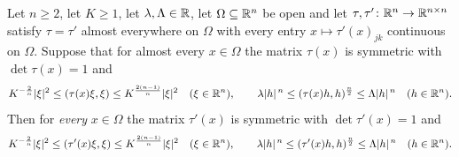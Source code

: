 \begin{lemma}
Let $n\ge2$, let $K\ge1$, let $\lambda,\Lambda\in\mathbb{R}$, let $\Omega\subseteq\mathbb{R}^n$ be open and
let $\tau,\tau'\colon\mathbb{R}^n\to\mathbb{R}^{n\times n}$ satisfy $\tau=\tau'$ almost
everywhere on $\Omega$ with every entry $x\mapsto\tau'(x)_{jk}$ continuous on
$\Omega$.  Suppose that for almost every $x\in\Omega$ the matrix $\tau(x)$ is
symmetric with $\det\tau(x)=1$ and
\[
K^{-\frac2n}|\xi|^2\le(\tau(x)\xi,\xi)\le K^{\frac{2(n-1)}n}|\xi|^2\quad
(\xi\in\mathbb{R}^n),
\qquad
\lambda|h|^{\,n}\le(\tau(x)h,h)^{\frac n2}\le\Lambda|h|^{\,n}\quad(h\in\mathbb{R}^n).
\]
Then for \emph{every} $x\in\Omega$ the matrix $\tau'(x)$ is symmetric with
$\det\tau'(x)=1$ and
\[
K^{-\frac2n}|\xi|^2\le(\tau'(x)\xi,\xi)\le K^{\frac{2(n-1)}n}|\xi|^2\quad
(\xi\in\mathbb{R}^n),
\qquad
\lambda|h|^{\,n}\le(\tau'(x)h,h)^{\frac n2}\le\Lambda|h|^{\,n}\quad(h\in\mathbb{R}^n).
\]
\end{lemma}
